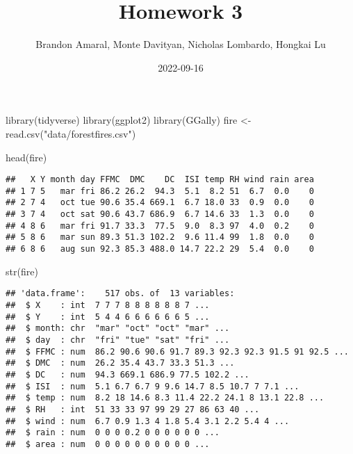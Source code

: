 \documentclass[
]{article}
\title{Homework 3}
\author{Brandon Amaral, Monte Davityan, Nicholas Lombardo, Hongkai Lu}
\date{2022-09-16}
\newenvironment{Shaded}{\begin{snugshade}}{\end{snugshade}}
\newcommand{\FunctionTok}[1]{\textcolor[rgb]{0.00,0.00,0.00}{#1}}
\newcommand{\NormalTok}[1]{#1}
\newcommand{\OtherTok}[1]{\textcolor[rgb]{0.56,0.35,0.01}{#1}}
\newcommand{\StringTok}[1]{\textcolor[rgb]{0.31,0.60,0.02}{#1}}
\begin{document}
\maketitle

\begin{Shaded}
\begin{Highlighting}[]
\FunctionTok{library}\NormalTok{(tidyverse)}
\FunctionTok{library}\NormalTok{(ggplot2)}
\FunctionTok{library}\NormalTok{(GGally)}
\NormalTok{fire }\OtherTok{\textless{}{-}} \FunctionTok{read.csv}\NormalTok{(}\StringTok{"data/forestfires.csv"}\NormalTok{)}
\end{Highlighting}
\end{Shaded}

\begin{Shaded}
\begin{Highlighting}[]
\FunctionTok{head}\NormalTok{(fire)}
\end{Highlighting}
\end{Shaded}

\begin{verbatim}
##   X Y month day FFMC  DMC    DC  ISI temp RH wind rain area
## 1 7 5   mar fri 86.2 26.2  94.3  5.1  8.2 51  6.7  0.0    0
## 2 7 4   oct tue 90.6 35.4 669.1  6.7 18.0 33  0.9  0.0    0
## 3 7 4   oct sat 90.6 43.7 686.9  6.7 14.6 33  1.3  0.0    0
## 4 8 6   mar fri 91.7 33.3  77.5  9.0  8.3 97  4.0  0.2    0
## 5 8 6   mar sun 89.3 51.3 102.2  9.6 11.4 99  1.8  0.0    0
## 6 8 6   aug sun 92.3 85.3 488.0 14.7 22.2 29  5.4  0.0    0
\end{verbatim}

\begin{Shaded}
\begin{Highlighting}[]
\FunctionTok{str}\NormalTok{(fire)}
\end{Highlighting}
\end{Shaded}

\begin{verbatim}
## 'data.frame':    517 obs. of  13 variables:
##  $ X    : int  7 7 7 8 8 8 8 8 8 7 ...
##  $ Y    : int  5 4 4 6 6 6 6 6 6 5 ...
##  $ month: chr  "mar" "oct" "oct" "mar" ...
##  $ day  : chr  "fri" "tue" "sat" "fri" ...
##  $ FFMC : num  86.2 90.6 90.6 91.7 89.3 92.3 92.3 91.5 91 92.5 ...
##  $ DMC  : num  26.2 35.4 43.7 33.3 51.3 ...
##  $ DC   : num  94.3 669.1 686.9 77.5 102.2 ...
##  $ ISI  : num  5.1 6.7 6.7 9 9.6 14.7 8.5 10.7 7 7.1 ...
##  $ temp : num  8.2 18 14.6 8.3 11.4 22.2 24.1 8 13.1 22.8 ...
##  $ RH   : int  51 33 33 97 99 29 27 86 63 40 ...
##  $ wind : num  6.7 0.9 1.3 4 1.8 5.4 3.1 2.2 5.4 4 ...
##  $ rain : num  0 0 0 0.2 0 0 0 0 0 0 ...
##  $ area : num  0 0 0 0 0 0 0 0 0 0 ...
\end{verbatim}
\end{document}
